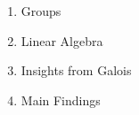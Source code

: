 \documentclass[preview]{standalone}
\begin{document}
\begin{center}
\begin{enumerate} \item Groups \item Linear Algebra \item Insights from Galois \item Main Findings \end{enumerate}
\end{center}
\end{document}
